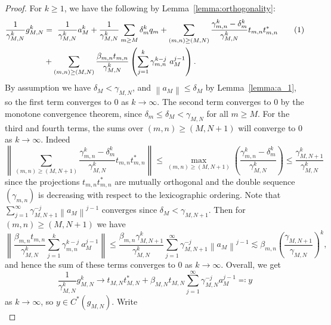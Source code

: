 \documentclass[12pt, a4paper]
{amsart}
\newcommand\numberthis{\addtocounter{equation}{1}\tag{\theequation}}
\newcommand{\norm}[1]{\left\|#1\right\|} %
\theoremstyle{definition}
\theoremstyle{remark}
\numberwithin{equation}{section}
\begin{document}
\begin{proof}
    For $k \ge 1$, we have the following by Lemma~\ref{lemma:orthogonality}:
    \begin{align*}
    \frac{1}{\gamma_{M,N}^k}g_{M,N}^k &= \ 
    \frac{1}{\gamma_{M,N}^k}a_M^k 
    + \frac{1}{\gamma_{M,N}^k} \sum_{m \ge M} \delta_m^k q_m + \sum_{(m,n) \ge (M,N)} \frac{\gamma_{m,n}^k-\delta_m^k}{\gamma_{M,N}^k} t_{m,n}t_{m,n}^*\numberthis\\
    &+ \sum_{(m,n) \ge (M,N)} \frac{\beta_{m,n} t_{m,n} }{\gamma_{M,N}^k} \left( \sum_{j=1}^{k} \gamma_{m,n}^{k-j} \ a_M^{j-1} \right).
    \end{align*}
    By assumption we have $\delta_M < \gamma_{M,N}$, and $\norm{a_M} \le \delta_M$ by Lemma~\ref{lemma:a_1}, so the first term converges to $0$ as $k \to \infty$. The second term converges to 0 by the monotone convergence theorem, since $\delta_m \le \delta_M < \gamma_{M,N}$ for all $m \ge M$. For the third and fourth terms, the sums over $(m,n) \ge (M, N+1)$ will converge to 0 as $k \to \infty$. Indeed
    \begin{equation}
    \norm{\sum_{(m,n) \ge (M,N+1)} \frac{\gamma_{m,n}^k-\delta_m^k}{\gamma_{M,N}^k} t_{m,n}t_{m,n}^*}
    \le \max_{(m,n) \ge (M,N+1)} \left( \frac{\gamma_{m,n}^k-\delta_m^k}{\gamma_{M,N}^k}\right)
    \le \frac{\gamma_{M,N+1}^k}{\gamma_{M,N}^k}
    \end{equation}
    since the projections $t_{m,n}t_{m,n}^*$ are mutually orthogonal and the double sequence $(\gamma_{m,n})$ is decreasing with respect to the lexicographic ordering. Note that $\sum_{j=1}^\infty \gamma_{M,N+1}^{-j} \norm{a_M}^{j-1}$ converges since $\delta_M < \gamma_{M,N+1}$. Then for $(m,n) \ge (M,N+1)$ we have
    \begin{equation}
    \norm{\frac{\beta_{m,n} t_{m,n}}{\gamma_{M,N}^k} \sum_{j=1}^{k} \gamma_{m,n}^{k-j} \ a_M^{j-1}} \le \frac{\beta_{m,n} \gamma_{M,N+1}^k}{\gamma_{M,N}^k} \sum_{j=1}^\infty \gamma_{M,N+1}^{-j} \norm{a_M}^{j-1} \lesssim \beta_{m,n} \left(\frac{\gamma_{M,N+1}}{\gamma_{M,N}}\right)^k,
    \end{equation}
    and hence the sum of these terms converges to 0 as $k \to \infty$. 
    Overall, we get
    \begin{equation}\label{eq:converge-to-y}
    \frac{1}{\gamma_{M,N}^k}g_{M,N}^k \to t_{M,N}t_{M,N}^* + \beta_{M,N} t_{M,N} \sum_{j=1}^\infty \gamma_{M,N}^{-j} a_M^{j-1} \eqqcolon y
    \end{equation}
    as $k \to \infty$, so $y \in C^*(g_{M,N})$. Write
    \begin{equation}

\end{equation}
\end{proof}
\end{document}

